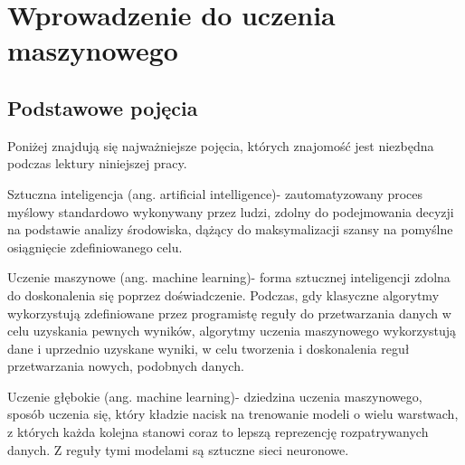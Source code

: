 \chapter{Wprowadzenie do uczenia maszynowego}
\thispagestyle{chapterBeginStyle}
\label{chapter2}


\section{Podstawowe pojęcia}
Poniżej znajdują się najważniejsze pojęcia, których znajomość jest niezbędna podczas lektury niniejszej pracy.

Sztuczna inteligencja (ang. artificial intelligence)- zautomatyzowany proces myślowy standardowo wykonywany przez ludzi, zdolny do podejmowania decyzji na podstawie analizy środowiska, dążący do maksymalizacji szansy na pomyślne osiągnięcie zdefiniowanego celu.

Uczenie maszynowe (ang. machine learning)- forma sztucznej inteligencji zdolna do doskonalenia się poprzez doświadczenie. Podczas, gdy klasyczne algorytmy wykorzystują zdefiniowane przez programistę reguły do przetwarzania danych w celu uzyskania pewnych wyników, algorytmy uczenia maszynowego wykorzystują dane i uprzednio uzyskane wyniki, w celu tworzenia i doskonalenia reguł przetwarzania nowych, podobnych danych.

Uczenie głębokie (ang. machine learning)- dziedzina uczenia maszynowego, sposób uczenia się, który kładzie nacisk na trenowanie modeli o wielu warstwach, z których każda kolejna stanowi coraz to lepszą reprezencję rozpatrywanych danych. Z reguły tymi modelami są sztuczne sieci neuronowe.

